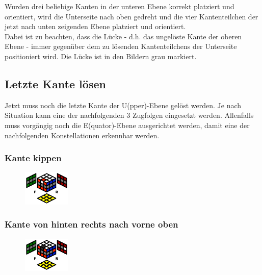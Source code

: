 \documentclass[letterpaper,10pt,twoside,twocolumn,openany]{book}
\begin{document}
\begin{justify}
Wurden drei beliebige Kanten in der unteren Ebene korrekt platziert und orientiert, wird die Unterseite nach oben gedreht und die vier Kantenteilchen der jetzt nach unten zeigenden Ebene platziert und orientiert.\\

\indent Dabei ist zu beachten, dass die Lücke - d.h. das ungelöste Kante der oberen Ebene - immer gegenüber dem zu lösenden Kantenteilchens der Unterseite positioniert wird. Die Lücke ist in den Bildern grau markiert.
\end{justify}

\subsection{Letzte Kante lösen}
\begin{justify}
Jetzt muss noch die letzte Kante der U(pper)-Ebene gelöst werden. Je nach  Situation kann eine der nachfolgenden 3 Zugfolgen eingesetzt werden. Allenfalls muss vorgängig noch die E(quator)-Ebene ausgerichtet werden, damit eine der nachfolgenden Konstellationen erkennbar werden.
\end{justify}
\subsubsection{Kante kippen}
\begin{figure}[!htb] 
  \centering
     \includegraphics[width=0.20\textwidth]{img/swap_cant.png}
\end{figure}

\newpage
\subsubsection{Kante von hinten rechts nach \newline vorne oben}
\begin{figure}[!htb] 
  \centering
     \includegraphics[width=0.20\textwidth]{img/stopf_easy.png}
\end{figure}
\end{document}
